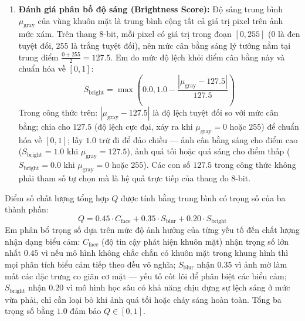 \begin{enumerate}
    \item \textbf{Đánh giá phân bố độ sáng (Brightness Score):} Độ sáng trung bình $\mu_{\text{gray}}$ của vùng khuôn mặt là trung bình cộng tất cả giá trị pixel trên ảnh mức xám. Trên thang 8-bit, mỗi pixel có giá trị trong đoạn $[0, 255]$ ($0$ là đen tuyệt đối, $255$ là trắng tuyệt đối), nên mức cân bằng sáng lý tưởng nằm tại trung điểm $\frac{0 + 255}{2} = 127.5$. Em đo mức độ lệch khỏi điểm cân bằng này và chuẩn hóa về $[0, 1]$:
    \begin{equation}
    S_{\text{bright}} = \max \left( 0.0, 1.0 - \frac{|\mu_{\text{gray}} - 127.5|}{127.5} \right)
    \end{equation}
    Trong công thức trên: $|\mu_{\text{gray}} - 127.5|$ là độ lệch tuyệt đối so với mức cân bằng; chia cho $127.5$ (độ lệch cực đại, xảy ra khi $\mu_{\text{gray}} = 0$ hoặc $255$) để chuẩn hóa về $[0, 1]$; lấy $1.0$ trừ đi để đảo chiều --- ảnh cân bằng sáng cho điểm cao ($S_{\text{bright}} = 1.0$ khi $\mu_{\text{gray}} = 127.5$), ảnh quá tối hoặc quá sáng cho điểm thấp ($S_{\text{bright}} = 0.0$ khi $\mu_{\text{gray}} = 0$ hoặc $255$). Các con số $127.5$ trong công thức không phải tham số tự chọn mà là hệ quả trực tiếp của thang đo 8-bit.
\end{enumerate}

Điểm số chất lượng tổng hợp $Q$ được tính bằng trung bình có trọng số của ba thành phần:
\begin{equation}
Q = 0.45 \cdot C_{\text{face}} + 0.35 \cdot S_{\text{blur}} + 0.20 \cdot S_{\text{bright}}
\end{equation}
Em phân bổ trọng số dựa trên mức độ ảnh hưởng của từng yếu tố đến chất lượng nhận dạng biểu cảm: $C_{\text{face}}$ (độ tin cậy phát hiện khuôn mặt) nhận trọng số lớn nhất $0.45$ vì nếu mô hình không chắc chắn có khuôn mặt trong khung hình thì mọi phân tích biểu cảm tiếp theo đều vô nghĩa; $S_{\text{blur}}$ nhận $0.35$ vì ảnh mờ làm mất các đặc trưng co giãn cơ mặt --- yếu tố cốt lõi để phân biệt các biểu cảm; $S_{\text{bright}}$ nhận $0.20$ vì mô hình học sâu có khả năng chịu đựng sự lệch sáng ở mức vừa phải, chỉ cần loại bỏ khi ảnh quá tối hoặc cháy sáng hoàn toàn. Tổng ba trọng số bằng $1.0$ đảm bảo $Q \in [0, 1]$.

